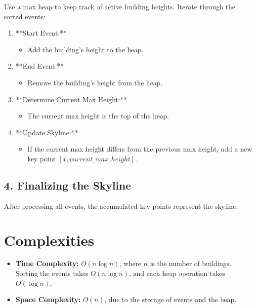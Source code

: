 Use a max heap to keep track of active building heights. Iterate through the sorted events:
\begin{enumerate}
    \item **Start Event:**
    \begin{itemize}
        \item Add the building's height to the heap.
    \end{itemize}
    
    \item **End Event:**
    \begin{itemize}
        \item Remove the building's height from the heap.
    \end{itemize}
    
    \item **Determine Current Max Height:**
    \begin{itemize}
        \item The current max height is the top of the heap.
    \end{itemize}
    
    \item **Update Skyline:**
    \begin{itemize}
        \item If the current max height differs from the previous max height, add a new key point \([x, current\_max\_height]\).
    \end{itemize}
\end{enumerate}

\subsection*{4. Finalizing the Skyline}

After processing all events, the accumulated key points represent the skyline.


\section*{Complexities}

\begin{itemize}
    \item \textbf{Time Complexity:} \(O(n \log n)\), where \(n\) is the number of buildings. Sorting the events takes \(O(n \log n)\), and each heap operation takes \(O(\log n)\).
    
    \item \textbf{Space Complexity:} \(O(n)\), due to the storage of events and the heap.
\end{itemize}

